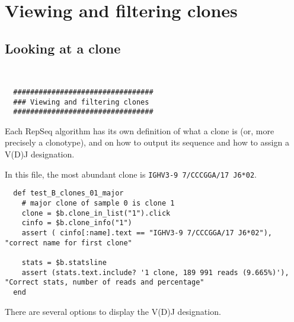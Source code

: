 \section{Viewing and filtering clones}


\subsection{Looking at a clone}
\begin{verbatim}


  #################################
  ### Viewing and filtering clones
  #################################

\end{verbatim}

Each RepSeq algorithm has its own definition of what a clone is (or, more precisely
a clonotype), and on how to output its sequence and how to assign a V(D)J designation.

In this file, the most abundant clone
is \texttt{IGHV3-9 7/CCCGGA/17 J6*02}.



\begin{verbatim}
  def test_B_clones_01_major
    # major clone of sample 0 is clone 1 
    clone = $b.clone_in_list("1").click
    cinfo = $b.clone_info("1")
    assert ( cinfo[:name].text == "IGHV3-9 7/CCCGGA/17 J6*02"), "correct name for first clone"

    stats = $b.statsline
    assert (stats.text.include? '1 clone, 189 991 reads (9.665%)'),  "Correct stats, number of reads and percentage"
  end
\end{verbatim}


There are several options to display the V(D)J designation.



